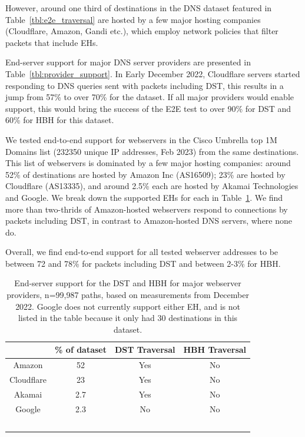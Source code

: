 \documentclass[conference]{IEEEtran}
\begin{document}
However, around one third of destinations in the DNS dataset featured in Table~\ref{tbl:e2e_traversal} are hosted by a few major hosting companies (Cloudflare, Amazon, Gandi etc.), which employ network policies that filter packets that include EHs. 

End-server support for major DNS server providers are presented in Table~\ref{tbl:provider_support}. In Early December 2022, Cloudflare servers started responding to DNS queries sent with packets including DST, this results in a jump from 57\% to over 70\% for the dataset. If all major providers would enable support, this would bring the success of the E2E test to over 90\% for DST and 60\% for HBH for this dataset.

We tested end-to-end support for webservers in the Cisco Umbrella top 1M Domains list (232350 unique IP addresses, Feb 2023) from the same destinations. This list of webservers is dominated by a few major hosting companies: around 52\% of destinations are hosted by Amazon Inc (AS16509); 23\% are hosted by Cloudflare (AS13335), and around 2.5\% each are hosted by Akamai Technologies and Google. We break down the supported EHs for each in Table~\ref{tbl:web_provider_support}. We find more than two-thrids of Amazon-hosted webservers respond to connections by packets including DST, in contrast to Amazon-hosted DNS servers, where none do. 

Overall, we find end-to-end support for all tested webserver addresses to be between 72 and 78\% for  packets including DST and between 2-3\% for HBH.


\begin{table} 
\begin{tabular}{c|c|c|c}
           & \% of dataset & DST Traversal & HBH Traversal\\
\hline
Amazon & 52                      & Yes                & No                 \\
\hline
Cloudflare     & 23                     & Yes                 & No                 \\
\hline
Akamai    & 2.7                     & Yes                & No                 \\
\hline
Google      & 2.3                     & No                 & No                 \\
\
\end{tabular}
\label{tbl:web_provider_support}
\caption{End-server support for the DST and HBH for major webserver providers, n=99,987 paths, based on measurements from December 2022. Google does not currently support either EH, and is not listed in the table because it only had 30 destinations in this dataset.
}
\end{table}
\end{document}
